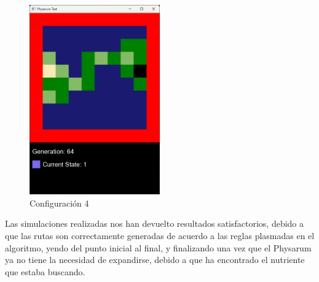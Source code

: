     \begin{figure}[htbp]
        \centering
        \includegraphics[width=0.5\textwidth]{./images/Pruebas/simulador/image006.png}
        \caption{Configuraci\'on 4}
        \label{fig:Ruta encontrada}
    \end{figure}
    \vskip 0.5cm
    Las simulaciones realizadas nos han devuelto resultados
        satisfactorios, debido a que las rutas son correctamente
        generadas de acuerdo a las reglas plasmadas en el algoritmo,
        yendo del punto inicial al final, y finalizando una vez que el
        Physarum ya no tiene la necesidad de expandirse, debido a
        que ha encontrado el nutriente que estaba buscando.
    \clearpage
